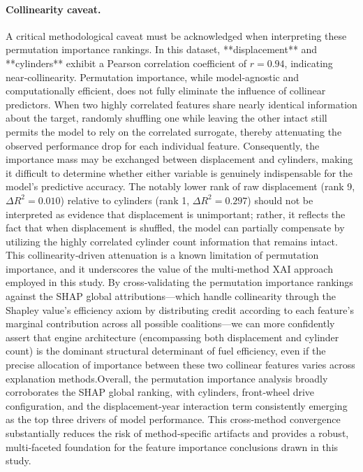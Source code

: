 \paragraph{Collinearity caveat.}
A critical methodological caveat must be acknowledged when interpreting these permutation importance rankings. In this dataset, **displacement** and **cylinders** exhibit a Pearson correlation coefficient of \(r = 0.94\), indicating near‑collinearity. Permutation importance, while model‑agnostic and computationally efficient, does not fully eliminate the influence of collinear predictors. When two highly correlated features share nearly identical information about the target, randomly shuffling one while leaving the other intact still permits the model to rely on the correlated surrogate, thereby attenuating the observed performance drop for each individual feature. Consequently, the importance mass may be exchanged between displacement and cylinders, making it difficult to determine whether either variable is genuinely indispensable for the model's predictive accuracy. The notably lower rank of raw displacement (rank 9, \(\Delta R^2 = 0.010\)) relative to cylinders (rank 1, \(\Delta R^2 = 0.297\)) should not be interpreted as evidence that displacement is unimportant; rather, it reflects the fact that when displacement is shuffled, the model can partially compensate by utilizing the highly correlated cylinder count information that remains intact. This collinearity‑driven attenuation is a known limitation of permutation importance, and it underscores the value of the multi‑method XAI approach employed in this study. By cross‑validating the permutation importance rankings against the SHAP global attributions—which handle collinearity through the Shapley value's efficiency axiom by distributing credit according to each feature's marginal contribution across all possible coalitions—we can more confidently assert that engine architecture (encompassing both displacement and cylinder count) is the dominant structural determinant of fuel efficiency, even if the precise allocation of importance between these two collinear features varies across explanation methods.Overall, the permutation importance analysis broadly corroborates the SHAP global ranking, with cylinders, front‑wheel drive configuration, and the displacement‑year interaction term consistently emerging as the top three drivers of model performance. This cross‑method convergence substantially reduces the risk of method‑specific artifacts and provides a robust, multi‑faceted foundation for the feature importance conclusions drawn in this study.



